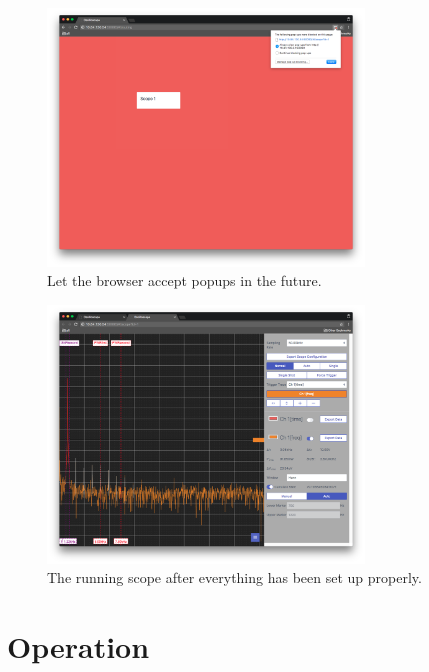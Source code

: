 \begin{figure}
    \centering
    \includegraphics[width=0.75\textwidth]{images/userguide/popup_yes}
    \caption[Accept popups in the future]{%
        Let the browser accept popups in the future.
    }
    \label{fig:userguide:popup:yes}
\end{figure}

\begin{figure}
    \centering
    \includegraphics[width=0.75\textwidth]{images/userguide/running}
    \caption[Running the scope]{%
        The running scope after everything has been set up properly.
    }
    \label{fig:userguide:running}
\end{figure}

%
%
\chapter{Operation} %
\label{ch:userguide:operation}


